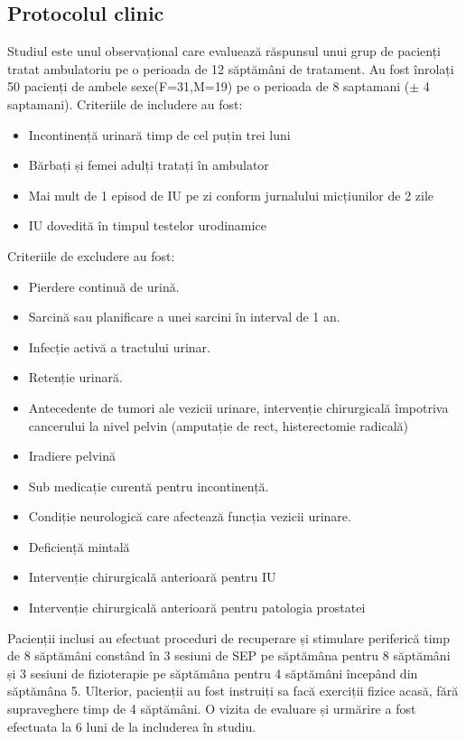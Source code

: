 \documentclass[11pt,draft]{article}
\begin{document}
\subsection{Protocolul clinic}
  Studiul este unul observațional care evaluează răspunsul unui grup de pacienți tratat ambulatoriu pe o perioada de 12 săptămâni de tratament. Au fost înrolați 50 pacienți de ambele sexe(F=31,M=19) pe o perioada de 8 saptamani ($\pm$ 4 saptamani). Criteriile de includere au fost:
  \begin{itemize}
    \item Incontinență urinară timp de cel puțin trei luni
    \item Bărbați și femei adulți tratați în ambulator
    \item Mai mult de 1 episod de IU pe zi conform jurnalului micțiunilor de 2 zile
    \item IU dovedită în timpul testelor urodinamice
   \end{itemize}
 Criteriile de excludere au fost:
  \begin{itemize}
    \item Pierdere continuă de urină.
    \item Sarcină sau planificare a unei sarcini în interval de 1 an.
    \item Infecție activă a tractului urinar.
    \item Retenție urinară.
    \item Antecedente de tumori ale vezicii urinare, intervenție chirurgicală împotriva cancerului la nivel pelvin (amputație de rect, histerectomie radicală)
    \item Iradiere pelvină
    \item Sub medicație curentă pentru incontinență.
    \item Condiție neurologică care afectează funcția vezicii urinare.
    \item Deficiență mintală 
    \item Intervenție chirurgicală anterioară pentru IU
    \item Intervenție chirurgicală anterioară pentru patologia prostatei 
   \end{itemize}
  Pacienții inclusi au efectuat proceduri de recuperare și stimulare periferică timp de 8 săptămâni constând în 3 sesiuni de \ac{SEP} pe săptămâna pentru 8 săptămâni și 3 sesiuni de fizioterapie pe săptămâna pentru 4 săptămâni începând din săptămâna 5. Ulterior, pacienții au fost instruiți sa facă exerciții fizice acasă, fără supraveghere timp de 4 săptămâni. O vizita de evaluare și urmărire a fost efectuata la 6 luni de la includerea în studiu.
  
\end{document}
